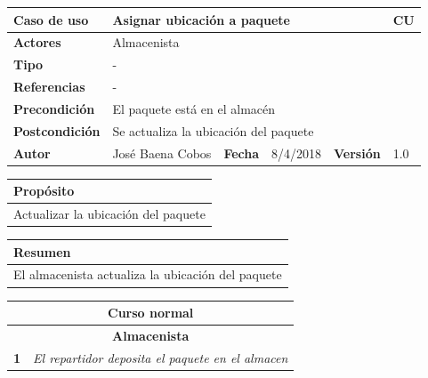 \documentclass[12pt,spanish]{article}
\begin{document}
\begin{table}[H]
	\centering
	\begin{tabular}{|m{3cm}|m{4cm}|m{2cm}|m{2cm}|m{2cm}|m{1cm}|}
		\hline
		\textbf{Caso de uso} &  \multicolumn{4}{m{11cm}|}{Asignar ubicación a paquete} \vline &  \cellcolor{gray!40}CU\arabic{contadorCU}  \stepcounter{contadorCU} \\
		\hline
		\textbf{Actores} & \multicolumn{5}{m{11cm}|}{Almacenista} \\
		\hline
		\textbf{Tipo} & \multicolumn{5}{m{11cm}|}{-} \\
		\hline
		\textbf{Referencias} &\multicolumn{5}{m{11cm}|}{-} \\
		\hline
		\textbf{Precondición} & \multicolumn{5}{m{11cm}|}{El paquete está en el almacén} \\
		\hline
		\textbf{Postcondición} & \multicolumn{5}{m{11cm}|}{Se actualiza la ubicación del paquete} \\
		\hline
		\textbf{Autor} & José Baena Cobos & \textbf{Fecha} & 8/4/2018 & \textbf{Versión} & 1.0 \\
		\hline
	\end{tabular}
	
	\vspace{1cm}
	
	\begin{tabular}{|m{16.2cm}|}
		\hline
		\textbf{Propósito} \\
		\hline
		Actualizar la ubicación del paquete \\
		\hline
	\end{tabular}
	
	\vspace{1cm}
	
	\begin{tabular}{|m{16.2cm}|}
		\hline
		\textbf{Resumen} \\
		\hline
		El almacenista actualiza la ubicación del paquete\\
		\hline
	\end{tabular}
	
	\vspace{1cm}
	
	\begin{tabular}{|m{5pt}|m{15.5cm}|}
		\hline
		\multicolumn{2}{|c|}{\textbf{Curso normal}} \\
		\hline
		\multicolumn{2}{|c|}{\textbf{Almacenista}} \\
		\hline
		\textbf{1} & \textit{El repartidor deposita el paquete en el almacen}\\
		\hline
		

\end{tabular}
\end{table}
\end{document}
